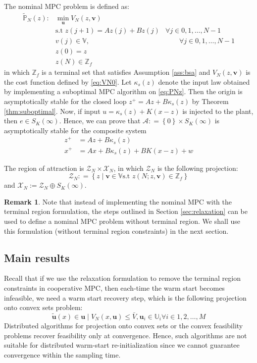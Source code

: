 \documentclass[10pt]{article}
\newcommand{\bu}{\mathbf{u}}
\newcommand{\set}[1]{\left\lbrace #1 \right\rbrace}
\theoremstyle{definition}
\newtheorem{remark}[assumption]{Remark}
\begin{document}
The nominal MPC problem is defined as:
\begin{align}
\tilde{\mathbb{P}}_N(z): & \min_{\bu}V_N(z,\mathbf{v}) \nonumber \\
& \text{s.t~} z(j+1) = Az(j) + Bz(j)&  \forall j \in 0,1,\ldots,N-1\nonumber\\
& v(j) \in \mathbb{V} \label{eq:PNz},
& \qquad  \forall j \in 0,1,\ldots,N-1 \\
& z(0) = z \nonumber \\
& z(N) \in \mathbb{Z}_f \nonumber
\end{align}
in which $\mathbb{Z}_f$ is a terminal set that satisfies Assumption
\ref{ass:bsa} and $V_N(z,\mathbf{v})$ is the cost function defined by
\eqref{eq:VN0}. Let $\kappa_s(z)$ denote the input law obtained by
implementing a suboptimal MPC algorithm on \eqref{eq:PNz}. Then the
origin is asymptotically stable for the closed loop $z^+ = Az+
B\kappa_s(z)$ by Theorem \ref{thm:suboptimal}. Now, if input $u =
\kappa_s(z) + K(x-z)$ is injected to the plant, then $e \in
S_K(\infty)$. Hence, we can prove that $\mathcal{A}: = \set{0} \times
S_K(\infty)$ is asymptotically stable for the composite system 
\begin{align}
z^+ &= Az + B\kappa_s(z)\\
x^+ &= Ax + B\kappa_s(z) + BK(x-z) + w 
\end{align}

The region of attraction is $\mathcal{Z}_N \times \mathcal{X}_N$, in
which $\mathcal{Z}_N$ is the following projection:
\[ \mathcal{Z}_N : = \set{z \mid \mathbf{v} \in \mathbb{V} \text{s.t~}
  z(N;z,\mathbf{v}) \in \mathbb{Z}_f}\]
and $\mathcal{X}_N := \mathcal{Z}_N \oplus S_K(\infty)$.

\begin{remark} Note that instead of implementing the nominal MPC with
  the terminal region formulation, the steps outlined in Section
  \ref{sec:relaxation} can be used to define a nominal MPC problem
  without terminal region. We shall use this formulation (without
  terminal region constraints) in the next section.
\end{remark}



\subsection{Main results}
Recall that if we use the relaxation formulation to remove the
terminal region constraints in cooperative MPC, then each-time the
warm start becomes infeasible, we need a warm start recovery step,
which is the following projection onto convex sets problem:
\[ \tilde{\bu}(x) \in {\bu \mid V_N(x,\bu) \leq \bar{V}, \bu_i \in
  \mathbb{U}_i \forall i \in 1,2,\ldots,M}\]
Distributed algorithms for projection onto convex sets or the convex
feasibility problems recover feasibility only at convergence. Hence,
such algorithms are not suitable for distributed warm-start
re-initialization since we cannot guarantee convergence within the
sampling time. 
\end{document}
